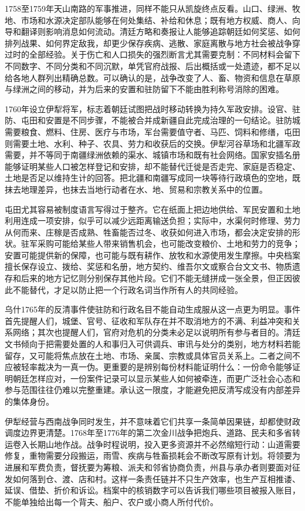 1758至1759年天山南路的军事推进，同样不能只从凯旋终点反看。山口、绿洲、牧地、市场和水源决定部队能够在何处集结、补给和休息；既有地方权威、商人、向导和翻译则影响消息如何流动。清廷方略和奏报让人能够追踪朝廷如何奖惩、如何排列战果、如何界定敌我，却更少保存疾病、逃散、家庭离散与地方社会被战争穿过时的全部经验。关于伤亡和人口损失的强烈断言尤其需要克制：不同材料会留下不同数字、不同分类和不同沉默，单凭官府战报、后出概括或一处遗迹，都不足以给各地人群列出精确总数。可以确认的是，战争改变了人、畜、物资和信息在草原与绿洲之间的移动，并为后来的安置和驻防留下不能由胜利称号消除的困难。

1760年设立伊犁将军，标志着朝廷试图把战时移动转换为持久军政安排。设官、驻防、屯田和安置是不同步骤，不能被合并成新疆自此完成治理的一句结论。驻防城需要粮食、燃料、住房、医疗与市场，军台需要值守者、马匹、饲料和修缮，屯田则需要土地、水利、种子、农具、劳力和收获后的交换。伊犁河谷草场和北疆军政需要，并不等同于南疆绿洲依赖的渠水、城镇市场和既有社会网络。国家安插名册能够证明某些人口被怎样登记和安排，却不能替代迁徙是否走完、家庭是否稳定、土地是否足以维持生计的回答。把北疆和南疆写成同一块等待行政填色的空地，既抹去地理差异，也抹去当地行动者在水、地、贸易和宗教关系中的位置。

屯田尤其容易被制度语言写得过于整齐。它在纸面上把边地供给、军民安置和土地利用连成一项安排，似乎可以减少远距离输送负担；实际中，水渠何时修理、劳力从何而来、庄稼是否成熟、牲畜能否过冬、收获如何进入市场，都会决定安排的形状。驻军采购可能给某些人带来销售机会，也可能改变粮价、土地和劳力的竞争；安置可能提供新的保障，也可能与既有耕作、放牧和水源使用发生摩擦。中央档案擅长保存设立、拨给、奖惩和名册，地方契约、维吾尔文或察合台文文书、物质遗存和后来的地方记忆则分别保存其他片段。它们不能无缝拼成一张全景，但正因彼此不能替代，才足以防止把一个行政名词当作所有人的共同经验。

乌什1765年的反清事件使驻防和行政名目不能自动生成服从这一点更为明显。事件首先提醒人们，城堡、官号、征收和军队存在并不取消地方的不满、利益冲突和关系网络；其次也提醒人们，官府对危机的分类未必足以说明所有参与者目的。清廷文书倾向于把需要处置的人和事归入可供调兵、审讯与处分的类别，地方材料若能留存，又可能将焦点放在土地、市场、亲属、宗教或具体官员关系上。二者之间不应被轻率裁决为一真一伪。更重要的是辨别每份材料能证明什么：一份命令能够证明朝廷怎样应对，一份案件记录可以显示某些人如何被牵连，而更广泛社会心态和参与范围往往仍难以完整重建。承认这一限度，才能避免把反清写成没有内部差异的集体身份。

伊犁经营与西南战争同时发生，并不意味着它们共享一条简单因果链，却都使财政调度边界更清楚。1768年至1776年的第二次金川战争把炮兵、道路、民夫和多省转运卷入长期山地作战。战争时程说明，投入更多资源并不必然缩短行动：山道需要修复，重物需要分段搬运，雨雪、疾病与牲畜损耗会不断改写原有计划。将领要为进展和军费负责，督抚要为筹粮、派夫和邻省协商负责，州县与承办者则要面对征发如何落到仓、渡、店和村。这样一条责任链并不只生产效率，也生产互相推诿、延误、借垫、折价和诉讼。档案中的核销数字可以告诉我们哪些项目被报入账目，不能单独给出每一个背夫、船户、农户或小商人所付代价。

